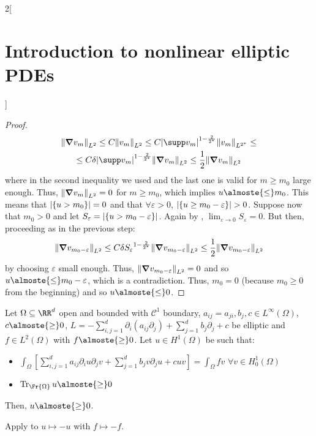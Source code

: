 \documentclass[../../../main_math.tex]{subfiles}
\begin{document}
\begin{multicols}{2}[\section{Introduction to nonlinear elliptic PDEs}]
\begin{proof}
    \begin{multline*}
      \norm{\grad v_m}_{L^2}\leq C \norm{v_m}_{L^2}\leq C{\abs{\supp v_m}}^{1-\frac{2}{2^*}}\norm{v_m}_{L^{2^*}}\leq \\
      \leq C\delta {\abs{\supp v_m}}^{1-\frac{2}{2^*}}\norm{\grad v_m}_{L^2}\leq \frac{1}{2} \norm{\grad v_m}_{L^2}
    \end{multline*}
    where in the second inequality we used  and the last one is valid for $m\geq m_0$ large enough. Thus, $\norm{\grad v_m}_{L^2}=0$ for $m\geq m_0$, which implies $u\almoste{\leq}m_0$. This means that $\abs{\{u>m_0\}}=0$ and that $\forall \varepsilon >0$, $\abs{\{u\geq m_0-\varepsilon\}}>0$. Suppose now that $m_0>0$ and let $S_\varepsilon=\abs{\{u> m_0-\varepsilon\}}$. Again by , $\displaystyle\lim_{\varepsilon\to 0}S_\varepsilon=0$. But then, proceeding as in the previous step:
    $$
      \norm{\grad v_{m_0-\varepsilon}}_{L^2}\leq C \delta {S_\varepsilon}^{1-\frac{2}{2^*}}\norm{\grad v_{m_0-\varepsilon}}_{L^2}\leq \frac{1}{2}\norm{\grad v_{m_0-\varepsilon}}_{L^2}
    $$
    by choosing $\varepsilon$ small enough. Thus, $\norm{\grad v_{m_0-\varepsilon}}_{L^2}=0$ and so $u\almoste{\leq}m_0-\varepsilon$, which is a contradiction. Thus, $m_0= 0$ (because $m_0\geq 0$ from the beginning) and so $u\almoste{\leq}0$.
  \end{proof}
  \begin{theorem}\label{INEPDE:weak_min_principle}
    Let $\Omega\subseteq\RR^d$ open and bounded with $\mathcal{C}^1$ boundary, $a_{ij}=a_{ji},b_j,c\in L^\infty(\Omega)$, $c \almoste{\geq}0$, $L=-\sum_{i,j=1}^d\partial_i(a_{ij}\partial_j)+\sum_{j=1}^db_j\partial_j+c$ be elliptic and $f\in L^2(\Omega)$ with $f\almoste{\geq} 0$. Let $u\in H^1(\Omega)$ be such that:
    \begin{itemize}
      \item $\displaystyle \int_\Omega\left[\sum_{i,j=1}^da_{ij}\partial_iu\partial_jv+ \sum_{j=1}^db_jv\partial_ju+cuv\right]=\int_\Omega fv$ $\forall v\in H^1_0(\Omega)$
      \item $\Tr_{\Fr{\Omega}}u\almoste{\geq}0$
    \end{itemize}
    Then, $u\almoste{\geq}0$.
  \end{theorem}
  \begin{sproof}
    Apply  to $u\mapsto -u$ with $f\mapsto -f$.
  \end{sproof}
  \begin{corollary}\label{INEPDE:corollary_max_min}

\end{corollary}
\end{multicols}
\end{document}
